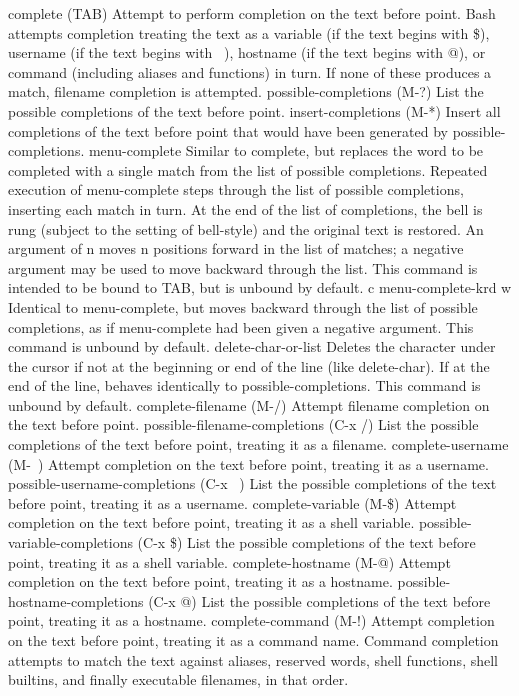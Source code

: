 complete (TAB)
Attempt to perform completion on the text before point. Bash attempts completion treating the text as a variable (if the text begins with \$), username (if the text begins with ~), hostname (if the text begins with @), or command (including aliases and functions) in turn. If none of these produces a match, filename completion is attempted.
possible-completions (M-?)
List the possible completions of the text before point.
insert-completions (M-*)
Insert all completions of the text before point that would have been generated by possible-completions.
menu-complete
Similar to complete, but replaces the word to be completed with a single match from the list of possible completions. Repeated execution of menu-complete steps through the list of possible completions, inserting each match in turn. At the end of the list of completions, the bell is rung (subject to the setting of bell-style) and the original text is restored. An argument of n moves n positions forward in the list of matches; a negative argument may be used to move backward through the list. This command is intended to be bound to TAB, but is unbound by default.
c menu-complete-krd w
Identical to menu-complete, but moves backward through the list of possible completions, as if menu-complete had been given a negative argument. This command is unbound by default.
delete-char-or-list
Deletes the character under the cursor if not at the beginning or end of the line (like delete-char). If at the end of the line, behaves identically to possible-completions. This command is unbound by default.
complete-filename (M-/)
Attempt filename completion on the text before point.
possible-filename-completions (C-x /)
List the possible completions of the text before point, treating it as a filename.
complete-username (M-~)
Attempt completion on the text before point, treating it as a username.
possible-username-completions (C-x ~)
List the possible completions of the text before point, treating it as a username.
complete-variable (M-\$)
Attempt completion on the text before point, treating it as a shell variable.
possible-variable-completions (C-x \$)
List the possible completions of the text before point, treating it as a shell variable.
complete-hostname (M-@)
Attempt completion on the text before point, treating it as a hostname.
possible-hostname-completions (C-x @)
List the possible completions of the text before point, treating it as a hostname.
complete-command (M-!)
Attempt completion on the text before point, treating it as a command name. Command completion attempts to match the text against aliases, reserved words, shell functions, shell builtins, and finally executable filenames, in that order.
